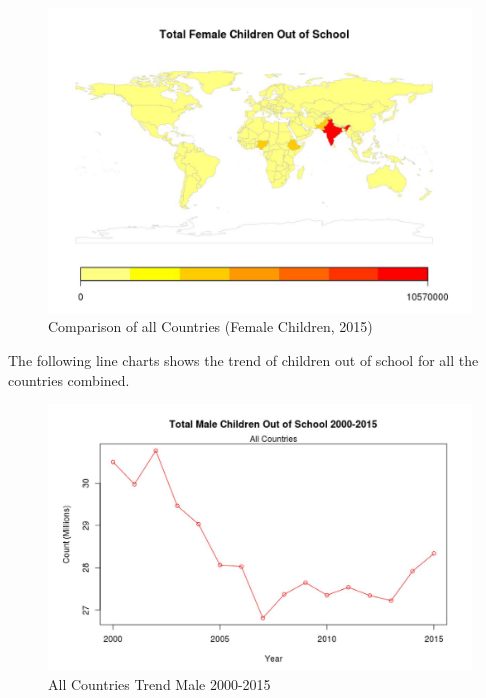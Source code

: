 \documentclass{article}
\begin{document}
\begin{figure}[H]
  \centering
    \includegraphics[scale=0.9]{FemaleMap}
  \caption{Comparison of all Countries (Female Children, 2015)}
\end{figure}

The following line charts shows the trend of children out of school for all the countries combined. 

\begin{figure}[H]
  \centering
    \includegraphics[scale=0.9]{MaleTrendAll}
  \caption{All Countries Trend Male 2000-2015}
\end{figure}
\end{document}
